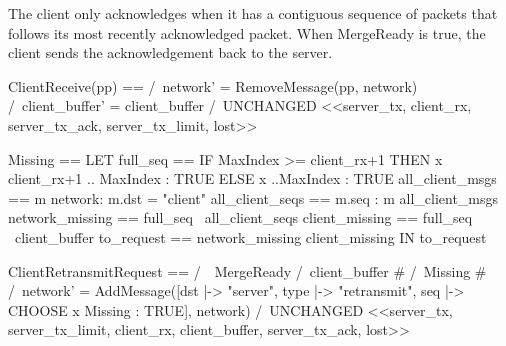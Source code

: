 The client only acknowledges when it has a contiguous sequence of packets that
follows its most recently acknowledged packet. When MergeReady is true, the
client sends the acknowledgement back to the server.\newline

\begin{tla}
ClientReceive(pp) == 
    /\ network' = RemoveMessage(pp, network)
    /\ client_buffer' = client_buffer 
    /\ UNCHANGED <<server_tx, client_rx, server_tx_ack, server_tx_limit, lost>>

Missing == 
    LET 
        full_seq == 
            IF MaxIndex >= client_rx+1 
            THEN 
                {x \in client_rx+1 .. MaxIndex : TRUE}
            ELSE 
                {x ..MaxIndex : TRUE} 
        all_client_msgs == {m \in network: m.dst = "client"}
        all_client_seqs == {m.seq : m \in all_client_msgs}
        network_missing == full_seq \ all_client_seqs
        client_missing == full_seq \ client_buffer
        to_request == network_missing \intersect client_missing
    IN 
        to_request

ClientRetransmitRequest == 
    /\ ~MergeReady
    /\ client_buffer # {}
    /\ Missing # {}
    /\ network' = AddMessage([dst |-> "server", 
                              type |-> "retransmit",
                              seq |-> CHOOSE x \in Missing : TRUE],
                                network)
    /\ UNCHANGED <<server_tx, server_tx_limit, client_rx, client_buffer, server_tx_ack, lost>>
\end{tla}

